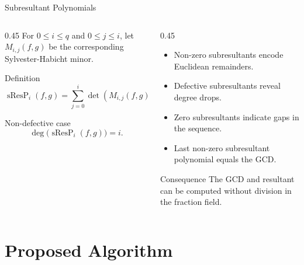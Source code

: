 \documentclass[aspectratio=169]{beamer}
\newcommand{\sResP}{\operatorname{sResP}}
\begin{document}
\begin{frame}{Subresultant Polynomials}
\footnotesize
\begin{columns}
\begin{column}{0.45\textwidth}
For $0\le i\le q$ and $0\le j\le i$, let $M_{i,j}(f,g)$ be the corresponding Sylvester-Habicht minor.

\begin{block}{Definition}
\[
  \sResP_i(f,g)=\sum_{j=0}^i \det(M_{i,j}(f,g))x^j.
\]
\end{block}

\begin{block}{Non-defective case}
\[
  \deg\bigl(\sResP_i(f,g)\bigr)=i.
\]
\end{block}
\end{column}
\pause
\begin{column}{0.45\textwidth}
\begin{itemize}
  \item Non-zero subresultants encode Euclidean remainders.
  \item Defective subresultants reveal degree drops.
  \item Zero subresultants indicate gaps in the sequence.
  \item Last non-zero subresultant polynomial equals the GCD.
\end{itemize}

\vspace{0.8em}
\begin{block}{Consequence}
The GCD and resultant can be computed without division in the fraction field.
\end{block}
\end{column}
\end{columns}
\end{frame}

\section{Proposed Algorithm}
\end{document}
